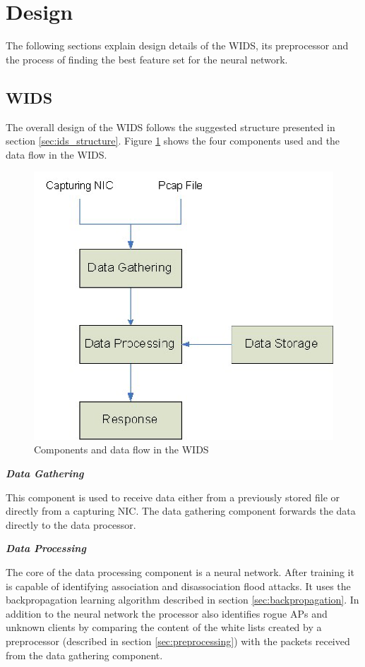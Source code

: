 \section{Design}

The following sections explain design details of the WIDS, its preprocessor and the process of finding the best feature set for the neural network.

\subsection{WIDS}
\label{sec:design_wids}

The overall design of the WIDS follows the suggested structure presented in section \ref{sec:ids_structure}. Figure \ref{wids_dataflow} shows the four components used and the data flow in the WIDS.

\begin{figure}[htbp]
	\begin{center}
		\includegraphics[width=0.7\columnwidth]{graphics/WIDS_structure}
	\end{center}
	\vspace{-1em}
	\caption{Components and data flow in the WIDS}
	\label{wids_dataflow}
\end{figure}

{\em {\bf Data Gathering}}

This component is used to receive data either from a previously stored file or directly from a capturing NIC. The data gathering component forwards the data directly to the data processor.

\pagebreak

{\em {\bf Data Processing}}

The core of the data processing component is a neural network. After training it is capable of identifying association and disassociation flood attacks. It uses the backpropagation learning algorithm described in section \ref{sec:backpropagation}. In addition to the neural network the processor also identifies rogue APs and unknown clients by comparing the content of the white lists created by a preprocessor (described in section \ref{sec:preprocessing}) with the packets received from the data gathering component.

